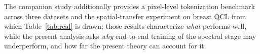 The companion study \citep{dziuba2026spatial} additionally provides a
pixel-level tokenization benchmark across three datasets and the
spatial-transfer experiment on breast QCL from which
Table~\ref{tab:real} is drawn; those results characterize \emph{what}
performs well, while the present analysis asks \emph{why} end-to-end
training of the spectral stage may underperform, and how far the
present theory can account for it.
